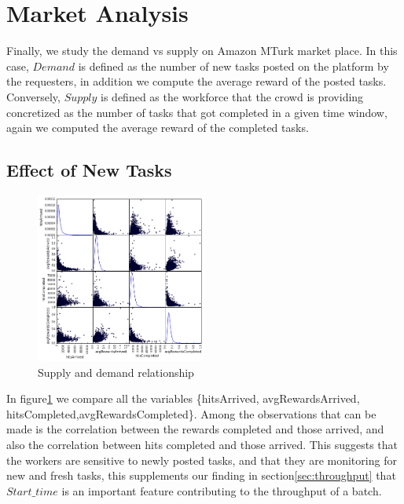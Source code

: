 \section{Market Analysis}
\label{sec:market}
Finally, we study the demand vs supply on Amazon MTurk market place.
In this case, $Demand$ is defined as the number of new tasks posted on the platform by the requesters, in addition we compute the average reward of the posted tasks. Conversely, $Supply$ is defined as the workforce that the crowd is providing concretized as the number of tasks that got completed in a given time window, again we computed the average reward of the completed tasks.
\subsection{Effect of New Tasks}
\begin{figure}[htbp]
	\centering
		\includegraphics[width=0.5\textwidth]{figures/scattermatrix}
	\caption{Supply and demand relationship}
	\label{fig:scatter_matrix}
\end{figure}
In figure\ref{fig:scatter_matrix} we compare all the variables \{hitsArrived, avgRewardsArrived, hitsCompleted,avgRewardsCompleted\}. Among the observations that can be made is the correlation between the rewards completed and those arrived, and also the correlation between hits completed and those arrived. This suggests that the workers are sensitive to newly posted tasks, and that they are monitoring for new and fresh tasks, this supplements our finding in section\ref{sec:throughput} that $Start\_time$ is an important feature contributing to the throughput of a batch.


